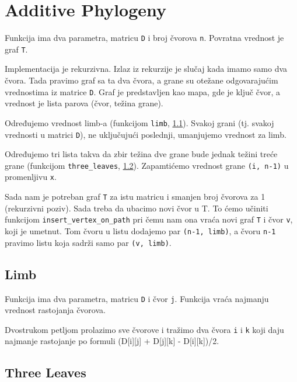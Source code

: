 \section{Additive Phylogeny}
\setbookcodestyle

Funkcija ima dva parametra, matricu \texttt{D} i broj čvorova \texttt{n}. Povratna vrednost je graf \texttt{T}.

Implementacija je rekurzivna. Izlaz iz rekurzije je slučaj kada imamo samo dva čvora. Tada pravimo graf sa ta dva čvora, a grane su otežane odgovarajućim vrednostima iz matrice \texttt{D}. Graf je predstavljen kao mapa, gde je ključ čvor, a vrednost je lista parova (čvor, težina grane).

Određujemo vrednost limb-a (funkcijom \texttt{limb}, \ref{limb}). Svakoj grani (tj. svakoj vrednosti u matrici \texttt{D}), ne uključujući poslednji, umanjujemo vrednost za limb.

Određujemo tri lista takva da zbir težina dve grane bude jednak težini treće grane (funkcijom \texttt{three\_leaves}, \ref{threeLeaves}). Zapamtićemo vrednost grane \texttt{(i, n-1)} u promenljivu \texttt{x}. 

Sada nam je potreban graf \texttt{T} za istu matricu i smanjen broj čvorova za 1 (rekurzivni poziv). Sada treba da ubacimo novi čvor u T. To ćemo učiniti funkcijom \texttt{insert\_vertex\_on\_path} pri čemu nam ona vraća novi graf \texttt{T} i čvor \texttt{v}, koji je umetnut. Tom čvoru u listu dodajemo par \texttt{(n-1, limb)}, a čvoru \texttt{n-1} pravimo listu koja sadrži samo par \texttt{(v, limb)}.




\subsection{Limb}
\label{limb}

Funkcija ima dva parametra, matricu \texttt{D} i čvor \texttt{j}. Funkcija vraća najmanju vrednost rastojanja čvorova.

Dvostrukom petljom prolazimo sve čvorove i tražimo dva čvora \texttt{i} i \texttt{k} koji daju najmanje rastojanje po formuli (D[i][j] + D[j][k] - D[i][k])/2.




\subsection{Three Leaves}
\label{threeLeaves}

